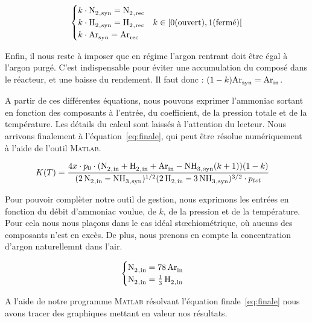 $$
\begin{cases}
 k\cdot \ce{N2_{,syn}} = \ce{N2_{,rec}} \\ 
 k\cdot \ce{H2_{,syn}} = \ce{H2_{,rec}} & k \in [0 \text{(ouvert)}, 1 \text{(fermé)}[ \\
 k\cdot \ce{Ar_{syn}} = \ce{Ar_{rec}} \\
\end{cases}
$$

Enfin, il nous reste à imposer que en régime l'argon rentrant doit être égal
à l'argon purgé. C'est indispensable pour éviter une accumulation du composé
dans le réacteur, et une baisse du rendement. 
Il faut donc : $(1 - k)\ce{Ar_{syn}} = \ce{Ar_{in}}$.

A partir de ces différentes équations, nous pouvons exprimer l'ammoniac
sortant en fonction des composants à l'entrée, du coefficient, de la pression
totale et de la température. Les détails du calcul sont laissés à l'attention 
du lecteur. Nous arrivons finalement à l'équation~\eqref{eq:finale}, qui peut
être résolue numériquement à l'aide de l'outil \textsc{Matlab}.

\begin{align}
	K(T) & = \frac{4x\cdot p_0\cdot (\ce{N2_{,in} + H2_{,in} + Ar_{in}} - 
	\ce{NH3_{,syn}}(k + 1)) (1 - k)}{(\ce{2N2_{,in} - NH3_{,syn}})^{1/2} (\ce{2H2_{,in} - 3NH3_{,syn}})^{3/2} \cdot p_{tot}}
	\label{eq:finale}
\end{align}

Pour pouvoir complèter notre outil de gestion, nous exprimons les entrées 
en fonction du débit d'ammoniac voulue, de $k$, de la pression et de la
température. Pour cela nous nous plaçons dans le cas idéal stœchiométrique,
où aucuns des composants n'est en excès. De plus, nous prenons en compte la 
concentration d'argon naturellemnt dans l'air. 
 
$$
\begin{cases}
 \ce{N2_{,in}} = \ce{78Ar_{in}}\\ 
 \ce{N2_{,in}} = \ce{1/3H2_{,in}} \\
\end{cases}
$$
 
A l'aide de notre programme \textsc{Matlab} résolvant l'équation finale~\eqref{eq:finale}  nous avons tracer des graphiques mettant en valeur nos résultats.

